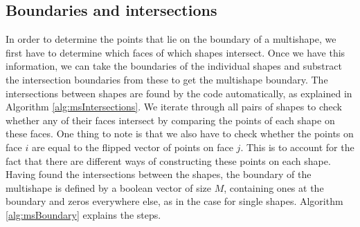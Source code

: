 \documentclass[11pt, a4paper]{article}
\theoremstyle{definition}
\begin{document}
\subsection{Boundaries and intersections}
In order to  determine the points that lie on the boundary of a multishape, we first have to determine which faces of which shapes intersect. Once we have this information, we can take the boundaries of the individual shapes and substract the intersection boundaries from these to get the multishape boundary.
The intersections between shapes are found by the code automatically, as explained in Algorithm \ref{alg:msIntersections}. We iterate through all pairs of shapes to check whether any of their faces intersect by comparing the points of each shape on these faces. One thing to note is that we also have to check whether the points on face $i$ are equal to the flipped vector of points on face $j$. This is to account for the fact that there are different ways of constructing these points on each shape.
Having found the intersections between the shapes, the boundary of the multishape is defined by a boolean vector of size $M$, containing ones at the boundary and zeros everywhere else, as in the case for single shapes. Algorithm \ref{alg:msBoundary} explains the steps.
\end{document}
